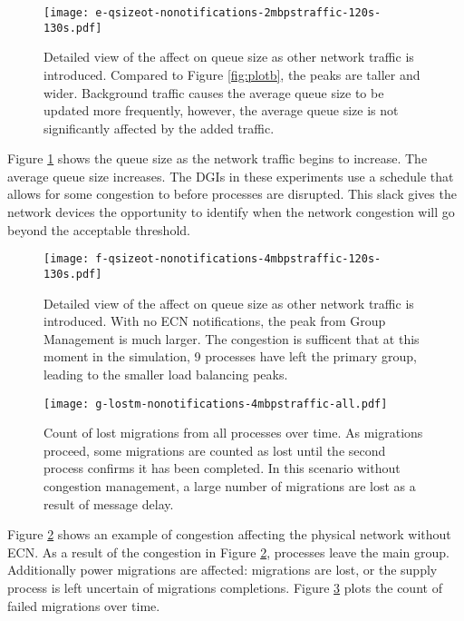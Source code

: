 \begin{figure}
\texttt{[image: e-qsizeot-nonotifications-2mbpstraffic-120s-130s.pdf]}
\caption{Detailed view of the affect on queue size as other network traffic is introduced. Compared to Figure \ref{fig:plotb}, the peaks are taller and wider. Background traffic causes the average queue size to be updated more frequently, however, the average queue size is not significantly affected by the added traffic.}
\label{fig:plote}
\end{figure}

Figure \ref{fig:plote} shows the queue size as the network traffic begins to increase.
The average queue size increases.
The \ac{DGI}s in these experiments use a schedule that allows for some congestion to before processes are disrupted.
This slack gives the network devices the opportunity to identify when the network congestion will go beyond the acceptable threshold.

\begin{figure}
\texttt{[image: f-qsizeot-nonotifications-4mbpstraffic-120s-130s.pdf]}
\caption{Detailed view of the affect on queue size as other network traffic is introduced. With no \ac{ECN} notifications, the peak from Group Management is much larger. The congestion is sufficent that at this moment in the simulation, 9 processes have left the primary group, leading to the smaller load balancing peaks.}
\label{fig:plotf}
\end{figure}

\begin{figure}
\texttt{[image: g-lostm-nonotifications-4mbpstraffic-all.pdf]}
\caption{Count of lost migrations from all processes over time. As migrations proceed, some migrations are counted as lost until the second process confirms it has been completed. In this scenario without congestion management, a large number of migrations are lost as a result of message delay.}
\label{fig:plotg}
\end{figure}

Figure \ref{fig:plotf} shows an example of congestion affecting the physical network without \ac{ECN}.
As a result of the congestion in Figure \ref{fig:plotf}, processes leave the main group.
Additionally power migrations are affected: migrations are lost, or the supply process is left uncertain of migrations completions.
Figure \ref{fig:plotg} plots the count of failed migrations over time.

